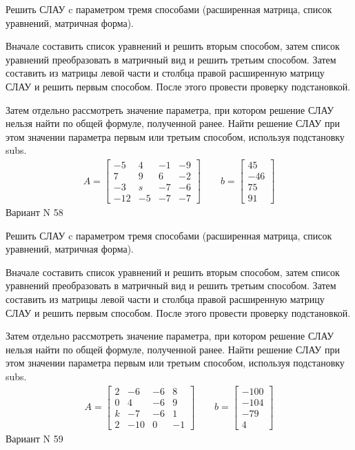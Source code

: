 \documentclass[11pt]{report}
\begin{document}
Решить СЛАУ c параметром тремя способами (расширенная матрица, список уравнений, матричная форма).

Вначале составить список уравнений и решить вторым способом,
затем список уравнений преобразовать в матричный вид и решить третьим способом.
Затем составить из матрицы левой части и столбца правой расширенную матрицу СЛАУ и решить первым способом.
После этого провести проверку подстановкой.

Затем отдельно рассмотреть значение параметра, при котором решение СЛАУ нельзя найти по общей формуле,
полученной ранее.
Найти решение СЛАУ при этом значении параметра первым или третьим способом, используя подстановку subs.
\begin{align*}
    A = \left[\begin{matrix}-5 & 4 & -1 & -9\\7 & 9 & 6 & -2\\-3 & s & -7 & -6\\-12 & -5 & -7 & -7\end{matrix}\right]
\qquad b = \left[\begin{matrix}45\\-46\\75\\91\end{matrix}\right]
\end{align*}
\newpage
Вариант N 58


Решить СЛАУ c параметром тремя способами (расширенная матрица, список уравнений, матричная форма).

Вначале составить список уравнений и решить вторым способом,
затем список уравнений преобразовать в матричный вид и решить третьим способом.
Затем составить из матрицы левой части и столбца правой расширенную матрицу СЛАУ и решить первым способом.
После этого провести проверку подстановкой.

Затем отдельно рассмотреть значение параметра, при котором решение СЛАУ нельзя найти по общей формуле,
полученной ранее.
Найти решение СЛАУ при этом значении параметра первым или третьим способом, используя подстановку subs.
\begin{align*}
    A = \left[\begin{matrix}2 & -6 & -6 & 8\\0 & 4 & -6 & 9\\k & -7 & -6 & 1\\2 & -10 & 0 & -1\end{matrix}\right]
\qquad b = \left[\begin{matrix}-100\\-104\\-79\\4\end{matrix}\right]
\end{align*}
\newpage
Вариант N 59
\end{document}
